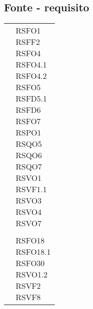 {{{{{{{{\subsection{Fonte - requisito}\label{RequisitiTracciamentoDeiRequisitiFonteRequisito}
\def\tabularxcolumn#1{m{#1}}
{
	\begin{center}
		\renewcommand{\arraystretch}{1.4}
		\begin{longtable}{|p{7.5cm}|p{7.5cm}|}
		\hline
		\rowcolor{airforceblue}
		\makecell[c]{\textbf{Fonte}} & \makecell[c]{\textbf{Codice RS}}  \\
		\hline
		\makecell[c]{Capitolato$_{\scaleto{G}{3pt}}$} & \makecell[c]{RSFO1\\RSFF2\\RSFO4\\RSFO4.1\\RSFO4.2\\RSFO5\\RSFD5.1\\RSFD6\\RSFO7\\RSPO1\\RSQO5\\RSQO6\\RSQO7\\RSVO1\\RSVF1.1\\RSVO3\\RSVO4\\RSVO7} \\
		\hline
		\hline
		\makecell[c]{Verbale esterno 17-12-2020} & \makecell[c]{RSFO1} \\
		\hline
		\makecell[c]{Verbale esterno 02-02-2021} & \makecell[c]{RSFO18\\RSFO18.1\\RSFO30\\RSVO1.2\\RSVF2\\RSVF8} \\
		\hline

\end{longtable}
\end{center}}}}}}}}}}
